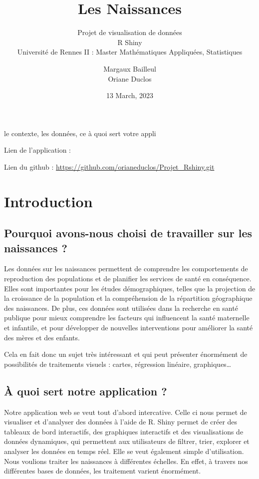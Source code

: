 \documentclass[
]{article}
\title{Les Naissances}
\subtitle{Projet de visualisation de données\\
R Shiny\\
Université de Rennes II : Master Mathématiques Appliquées, Statistiques}
\author{Margaux Bailleul\\
Oriane Duclos}
\date{13 March, 2023}
\begin{document}
\maketitle

{
\setcounter{tocdepth}{2}
\tableofcontents
}
le contexte, les données, ce à quoi sert votre appli

Lien de l'application :

Lien du github : \url{https://github.com/orianeduclos/Projet_Rshiny.git}

\hypertarget{introduction}{%
\section{Introduction}\label{introduction}}

\hypertarget{pourquoi-avons-nous-choisi-de-travailler-sur-les-naissances}{%
\subsection{Pourquoi avons-nous choisi de travailler sur les naissances
?}\label{pourquoi-avons-nous-choisi-de-travailler-sur-les-naissances}}

Les données sur les naissances permettent de comprendre les
comportements de reproduction des populations et de planifier les
services de santé en conséquence. Elles sont importantes pour les études
démographiques, telles que la projection de la croissance de la
population et la compréhension de la répartition géographique des
naissances. De plus, ces données sont utilisées dans la recherche en
santé publique pour mieux comprendre les facteurs qui influencent la
santé maternelle et infantile, et pour développer de nouvelles
interventions pour améliorer la santé des mères et des enfants.

Cela en fait donc un sujet très intéressant et qui peut présenter
énormément de possibilités de traitements visuels : cartes, régression
linéaire, graphiques\ldots{}

\hypertarget{uxe0-quoi-sert-notre-application}{%
\subsection{À quoi sert notre application
?}\label{uxe0-quoi-sert-notre-application}}

Notre application web se veut tout d'abord intercative. Celle ci nous
permet de visualiser et d'analyser des données à l'aide de R. Shiny
permet de créer des tableaux de bord interactifs, des graphiques
interactifs et des visualisations de données dynamiques, qui permettent
aux utilisateurs de filtrer, trier, explorer et analyser les données en
temps réel. Elle se veut également simple d'utilisation. Nous voulions
traiter les naissances à différentes échelles. En effet, à travers nos
différentes bases de données, les traitement varient énormément.
\end{document}
